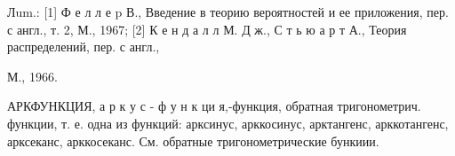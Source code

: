 \documentclass[10pt]{article}
\begin{document}
Лum.: [1] Ф е л л е p В., Введение в теорию вероятностей и ее приложения, пер. с англ., т. 2, М., 1967; [2] К е н д а л л М. Д ж., С т ь ю а р т А., Теория распределений, пер. с англ.,

М., 1966.



АРКФУНКЦИЯ, а р к у с - ф у н к ци я,-функция, обратная тригонометрич. функции, т. е. одна из функций: арксинус, арккосинус, арктангенс, арккотангенс, арксеканс, арккосеканс. См. обратные тригонометрические бункиии.
\end{document}

